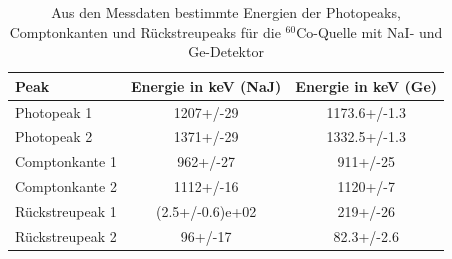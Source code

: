 \begin{table}[H]
\centering
\begin{tabular}{lcc}
\toprule
Peak & Energie in keV (NaJ) & Energie in keV (Ge) \\
\midrule
Photopeak 1 & 1207+/-29 & 1173.6+/-1.3 \\
Photopeak 2 & 1371+/-29 & 1332.5+/-1.3 \\
Comptonkante 1 & 962+/-27 & 911+/-25 \\
Comptonkante 2 & 1112+/-16 & 1120+/-7 \\
Rückstreupeak 1 & (2.5+/-0.6)e+02 & 219+/-26 \\
Rückstreupeak 2 & 96+/-17 & 82.3+/-2.6 \\
\bottomrule
\end{tabular}
\caption{Aus den Messdaten bestimmte Energien der Photopeaks, Comptonkanten und Rückstreupeaks für die $^{60}$Co-Quelle mit NaI- und Ge-Detektor}
\label{tab:energy-calibration}
\end{table}

